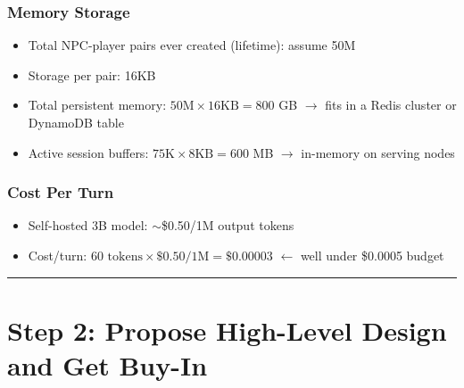 \subsubsection*{Memory Storage}
\begin{itemize}
  \item Total NPC-player pairs ever created (lifetime): assume 50M
  \item Storage per pair: 16KB
  \item Total persistent memory: $50\text{M} \times 16\text{KB} = 800$ GB $\rightarrow$ fits in a Redis cluster or DynamoDB table
  \item Active session buffers: $75\text{K} \times 8\text{KB} = 600$ MB $\rightarrow$ in-memory on serving nodes
\end{itemize}

\subsubsection*{Cost Per Turn}
\begin{itemize}
  \item Self-hosted 3B model: $\sim$\$0.50/1M output tokens
  \item Cost/turn: $60 \text{ tokens} \times \$0.50/\text{1M} = \$0.00003$ $\leftarrow$ well under \$0.0005 budget
\end{itemize}

\bigskip\hrule\bigskip

\section*{Step 2: Propose High-Level Design and Get Buy-In}

